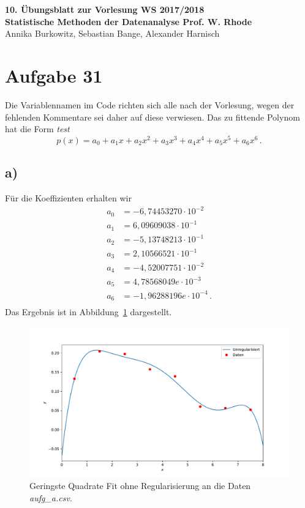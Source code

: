 \documentclass[a4paper, 11pt]{article}
\begin{document}
\noindent
\large{\textbf{10. Übungsblatt zur Vorlesung \hfill WS 2017/2018 \\
Statistische Methoden der Datenanalyse \hfill Prof. W. Rhode}} \\
Annika Burkowitz, Sebastian Bange, Alexander Harnisch \\
\noindent\makebox[\linewidth]{\rule{\textwidth}{0.4pt}}

\section*{Aufgabe 31}
Die Variablennamen im Code richten sich alle nach der Vorlesung, wegen der fehlenden Kommentare sei daher auf diese verwiesen. Das zu fittende Polynom hat die Form \textit{test}
\begin{equation}
    p(x) = a_0 + a_1x + a_2x^2 + a_3x^3 + a_4x^4 + a_5x^5 + a_6x^6\,.
    \label{eqn:poly}
\end{equation}

\subsection*{a)}
Für die Koeffizienten erhalten wir
\begin{equation}
    \begin{split}
        a_0 &= -6,74453270\cdot 10^{-2} \\
        a_1 &= 6,09609038\cdot 10^{-1}  \\
        a_2 &= -5,13748213\cdot 10^{-1} \\
        a_3 &= 2,10566521\cdot 10^{-1}  \\
        a_4 &= -4,52007751\cdot 10^{-2} \\
        a_5 &= 4,78568049e\cdot 10^{-3}  \\
        a_6 &= -1,96288196e\cdot 10^{-4}\,. \\
    \end{split}
\end{equation}
Das Ergebnis ist in Abbildung~\ref{fig:31a} dargestellt.
\begin{figure}
    \centering
    \includegraphics[width=\textwidth]{../A31/A31a.pdf}
    \caption{Geringste Quadrate Fit ohne Regularisierung an die Daten \textit{aufg\_a.csv}.}
    \label{fig:31a}
\end{figure}
\FloatBarrier
\end{document}
